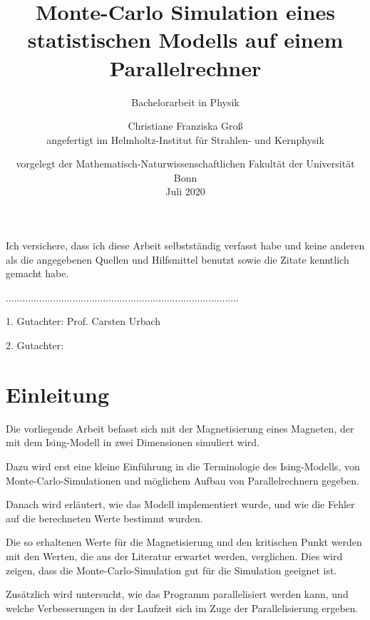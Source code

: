 \documentclass{scrreprt}
\title{Monte-Carlo Simulation eines statistischen Modells auf einem Parallelrechner}
\subtitle{Bachelorarbeit in Physik}
\date{vorgelegt der Mathematisch-Naturwissenschaftlichen Fakultät der Universität Bonn \\ Juli 2020}
\author{Christiane Franziska Groß\\ angefertigt im Helmholtz-Institut für Strahlen- und Kernphysik}
\begin{document}
	\maketitle
	
	
	Ich versichere, dass ich diese Arbeit selbstständig verfasst habe und keine anderen als die angegebenen Quellen und Hilfsmittel benutzt sowie die Zitate kenntlich gemacht habe.

	\vspace{2cm}
	
	....................................................................................
	
	\vspace{5cm}	
	
	1. Gutachter: Prof. Carsten Urbach
	
	2. Gutachter: 
	
	\newpage
	
	\tableofcontents
	
	\clearpage
	
	
	\section*{Einleitung}
	
	
	Die vorliegende Arbeit befasst sich mit der Magnetisierung eines Magneten, der mit dem Ising-Modell in zwei Dimensionen simuliert wird. 
	
	Dazu wird erst eine kleine Einführung in die Terminologie des Ising-Modells, von Monte-Carlo-Simulationen und möglichem Aufbau von Parallelrechnern gegeben.
	
	Danach wird erläutert, wie das Modell implementiert wurde, und wie die Fehler auf die berechneten Werte bestimmt wurden.
	
	Die so erhaltenen Werte für die Magnetisierung und den kritischen Punkt werden mit den Werten, die aus der Literatur erwartet werden, verglichen. Dies wird zeigen, dass die Monte-Carlo-Simulation gut für die Simulation geeignet ist.
	
	Zusätzlich wird untersucht, wie das Programm parallelisiert werden kann, und welche Verbesserungen in der Laufzeit sich im Zuge der Parallelisierung ergeben.
	
\end{document}
